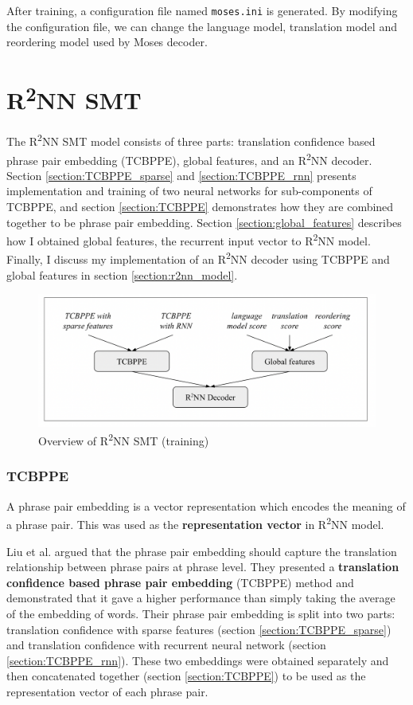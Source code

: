 \documentclass[12pt,a4paper,twoside,openright]{report}
\begin{document}
After training, a configuration file named \texttt{moses.ini} is generated. By modifying the configuration file, we can change the language model, translation model and reordering model used by Moses decoder.


\section{\texorpdfstring{R\textsuperscript{2}NN}{R2NN} SMT}\label{section:r2nn}

The R\textsuperscript{2}NN SMT model consists of three parts: translation confidence based phrase pair embedding (TCBPPE), global features, and an R\textsuperscript{2}NN decoder. Section \ref{section:TCBPPE_sparse} and \ref{section:TCBPPE_rnn} presents implementation and training of two neural networks for sub-components of TCBPPE, and section \ref{section:TCBPPE} demonstrates how they are combined together to be phrase pair embedding. Section \ref{section:global_features} describes how I obtained global features, the recurrent input vector to R\textsuperscript{2}NN model. Finally, I discuss my implementation of an R\textsuperscript{2}NN decoder using TCBPPE and global features in section \ref{section:r2nn_model}.

\begin{figure}[ht]
\centering
\includegraphics[width=1\textwidth]{images/r2nn_pipeline.png}
\caption{Overview of R\textsuperscript{2}NN SMT (training)}
\label{fig:r2nn_pipeline}
\end{figure}

\subsubsection{TCBPPE}
A phrase pair embedding is a vector representation which encodes the meaning of a phrase pair. This was used as the \textbf{representation vector} in R\textsuperscript{2}NN model. 

Liu et al.\cite{r2nn} argued that the phrase pair embedding should capture the translation relationship between phrase pairs at phrase level. They presented a \textbf{translation confidence based phrase pair embedding} (TCBPPE) method and demonstrated that it gave a higher performance than simply taking the average of the embedding of words. Their phrase pair embedding is split into two parts: translation confidence with sparse features (section \ref{section:TCBPPE_sparse}) and translation confidence with recurrent neural network (section \ref{section:TCBPPE_rnn}). These two embeddings were obtained separately and then concatenated together (section \ref{section:TCBPPE}) to be used as the representation vector of each phrase pair.
\end{document}
